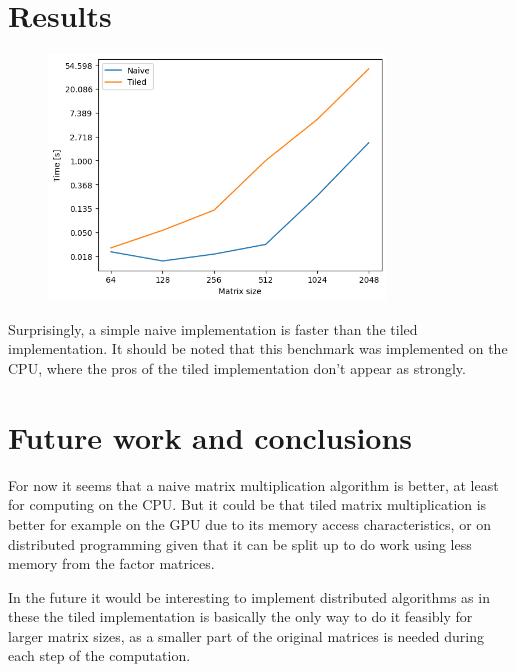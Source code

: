 \documentclass{article}
\begin{document}
\section{Results}

\begin{figure}[h!]
	\centering
	\includegraphics[width=0.8\textwidth]{result.png}
\end{figure}

Surprisingly, a simple naive implementation is faster than the tiled implementation. It should be noted that this benchmark was implemented on
the CPU, where the pros of the tiled implementation don't appear as strongly.

\section{Future work and conclusions}

For now it seems that a naive matrix multiplication algorithm is better, at least for computing on the CPU.
But it could be that tiled matrix multiplication is better for example on the GPU due to its memory access characteristics,
or on distributed programming given that it can be split up to do work using less memory from the factor matrices.

In the future it would be interesting to implement distributed algorithms as in these the tiled implementation is basically the only way
to do it feasibly for larger matrix sizes, as a smaller part of the original matrices is needed during each step of the computation.
\end{document}
